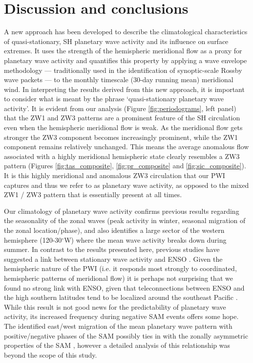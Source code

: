 \section{Discussion and conclusions}

A new approach has been developed to describe the climatological characteristics of quasi-stationary, SH planetary wave activity and its influence on surface extremes. It uses the strength of the hemispheric meridional flow as a proxy for planetary wave activity and quantifies this property by applying a wave envelope methodology --- traditionally used in the identification of synoptic-scale Rossby wave packets --- to the monthly timescale (30-day running mean) meridional wind. In interpreting the results derived from this new approach, it is important to consider what is meant by the phrase `quasi-stationary planetary wave activity'. It is evident from our analysis (Figure \ref{fig:periodograms}, left panel) that the ZW1 and ZW3 patterns are a prominent feature of the SH circulation even when the hemispheric meridional flow is weak. As the meridional flow gets stronger the ZW3 component becomes increasingly prominent, while the ZW1 component remains relatively unchanged. This means the average anomalous flow associated with a highly meridional hemispheric state clearly resembles a ZW3 pattern (Figures \ref{fig:tas_composite}, \ref{fig:pr_composite} and \ref{fig:sic_composite}). It is this highly meridional and anomalous ZW3 circulation that our PWI captures and thus we refer to as planetary wave activity, as opposed to the mixed ZW1 / ZW3 pattern that is essentially present at all times.  

Our climatology of planetary wave activity confirms previous results regarding the seasonality of the zonal waves (peak activity in winter, seasonal migration of the zonal location/phase), and also identifies a large sector of the western hemisphere (120-30$^{\circ}$W) where the mean wave activity breaks down during summer. In contrast to the results presented here, previous studies have suggested a link between stationary wave activity and ENSO \citep[e.g.][]{Trenberth1980,Raphael2003,Hobbs2007}. Given the hemispheric nature of the PWI (i.e. it responds most strongly to coordinated, hemispheric patterns of meridional flow) it is perhaps not surprising that we found no strong link with ENSO, given that teleconnections between ENSO and the high southern latitudes tend to be localized around the southeast Pacific \citep{Turner2004}. While this result is not good news for the predictability of planetary wave activity, its increased frequency during negative SAM events offers some hope. The identified east/west migration of the mean planetary wave pattern with positive/negative phases of the SAM possibly ties in with the zonally asymmetric properties of the SAM \citep[e.g.][]{Kidson1988,Kidston2009}, however a detailed analysis of this relationship was beyond the scope of this study.

